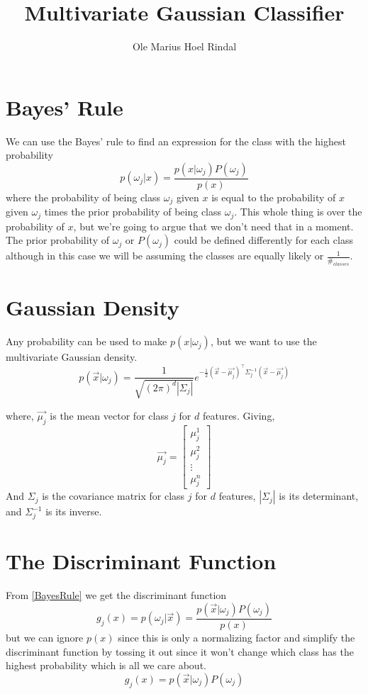 \documentclass[12pt, a4paper]{report}
\author{Ole Marius Hoel Rindal}
\title{Multivariate Gaussian Classifier}
\begin{document}
	\maketitle
	
	\section*{Bayes' Rule}
	We can use the Bayes' rule to find an expression for the class with the highest probability
	\begin{equation}
		p(\omega_j|x) = \frac{p(x|\omega_j)P(\omega_j)}{p(x)}
		\label{BayesRule}
	\end{equation}
	where the probability of being class $\omega_j$ given $x$ is equal to the probability of $x$ given $\omega_j$ times the prior probability of being class $\omega_j$. This whole thing is over the probability of $x$, but we're going to argue that we don't need that in a moment. The prior probability of $\omega_j$ or $P(\omega_j)$ could be defined differently for each class although in this case we will be assuming the classes are equally likely or $\frac{1}{\#_{classes}}$. 
	\section*{Gaussian Density}
	Any probability can be used to make $p(x|\omega_j)$, but we want to use the multivariate Gaussian density.
	\begin{equation}
		p(\vec{x}|\omega_j) = \frac{1}{\sqrt{(2\pi)^d|\Sigma_j|}}e^{-\frac{1}{2}(\vec{x}-\vec{\mu_j})^\intercal\Sigma_j^{-1}(\vec{x}-\vec{\mu_j})}
	\end{equation}
	
	where, $\vec{\mu_j}$ is the mean vector for class $j$ for $d$ features. Giving, 
	\begin{equation}
		\vec{\mu_j} = \begin{bmatrix}
			\mu_j^1\\\mu_j^2\\\vdots\\\mu_j^n
		\end{bmatrix}
	\end{equation}
	And $\Sigma_j$ is the covariance matrix for class $j$ for $d$ features, $|\Sigma_j|$ is its determinant, and $\Sigma_j^{-1}$ is its inverse.
	
	\section*{The Discriminant Function}
	From \eqref{BayesRule} we get the discriminant function 
	\begin{equation}
		g_j(x) = p(\omega_j|\vec{x}) = \frac{p(\vec{x}|\omega_j)P(\omega_j)}{p(x)}
	\end{equation}
	but we can ignore $p(x)$ since this is only a normalizing factor and simplify the discriminant function by tossing it out since it won't change which class has the highest probability which is all we care about.
	\begin{equation}
		g_j(x) = p(\vec{x}|\omega_j)P(\omega_j)
	\end{equation}
	
\end{document}
